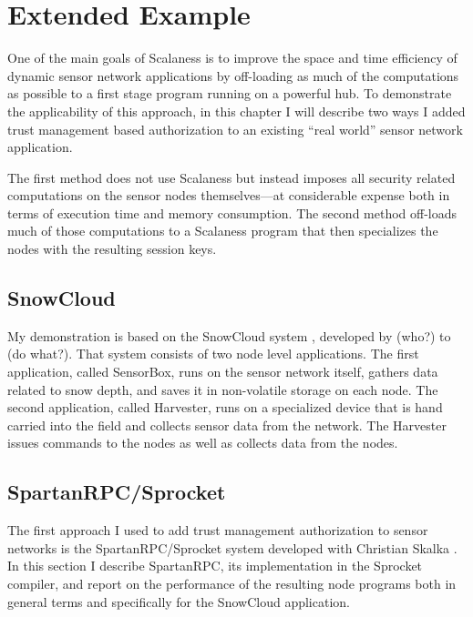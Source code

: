 \chapter{Extended Example}
\label{chap:extended-example}

One of the main goals of Scalaness is to improve the space and time efficiency of dynamic sensor
network applications by off-loading as much of the computations as possible to a first stage
program running on a powerful hub. To demonstrate the applicability of this approach, in this
chapter I will describe two ways I added trust management based authorization to an existing
``real world'' sensor network application.

The first method does not use Scalaness but instead imposes all security related computations on
the sensor nodes themselves---at considerable expense both in terms of execution time and memory
consumption. The second method off-loads much of those computations to a Scalaness program that
then specializes the nodes with the resulting session keys.

\section{SnowCloud}

My demonstration is based on the SnowCloud system \cite{XXX}, developed by (who?) to (do what?).
 That system consists of two node level applications. The first application, called
SensorBox, runs on the sensor network itself, gathers data related to snow depth, and saves it
in non-volatile storage on each node. The second application, called Harvester, runs on a
specialized device that is hand carried into the field and collects sensor data from the
network. The Harvester issues commands to the nodes as well as collects data from the nodes.


\section{SpartanRPC/Sprocket}

The first approach I used to add trust management authorization to sensor networks is the
SpartanRPC/Sprocket system developed with Christian Skalka \cite{XXX}. In this section I
describe SpartanRPC, its implementation in the Sprocket compiler, and report on the performance
of the resulting node programs both in general terms and specifically for the SnowCloud
application.

